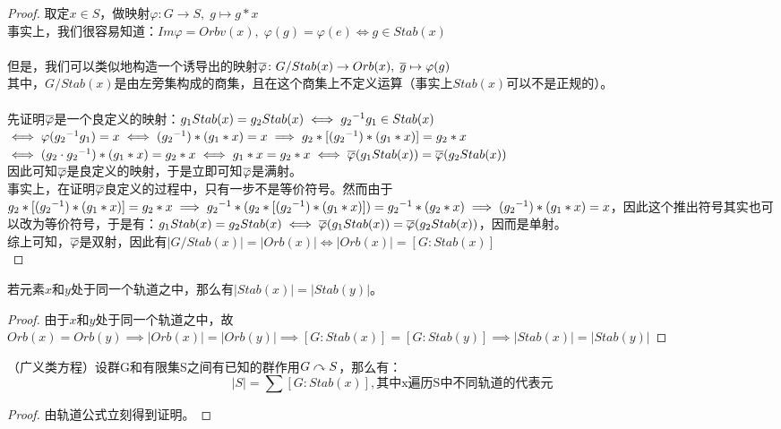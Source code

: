 \begin{proof}
取定$x\in S$，做映射$\varphi\colon G\to S,\; g\mapsto g*x$\\
事实上，我们很容易知道：$Im\varphi =Orbv(x),\; \varphi(g)=\varphi(e)\iff g\in Stab(x)$\\
\\
但是，我们可以类似地构造一个诱导出的映射$\overline{\varphi} \colon G/Stab(x)\to Orb(x),\;\overline{g}\mapsto\varphi(g)$\\
其中，$G/Stab(x)$是由左旁集构成的商集，且在这个商集上不定义运算（事实上$Stab(x)$可以不是正规的）。\\
\\
先证明$\overline{\varphi}$是一个良定义的映射：$g_1Stab(x)=g_2Stab(x)\iff {g_2}^{-1}g_1\in Stab(x)$\\
$\iff \varphi({g_2}^{-1}g_1)=x\iff ({g_2}^{-1})*(g_1*x)=x \implies g_2*[({g_2}^{-1})*(g_1*x)]=g_2*x$\\
$\iff (g_2\cdot {g_2}^{-1})*(g_1*x)=g_2*x\iff g_1*x=g_2*x\iff \overline{\varphi}(g_1Stab(x))=\overline{\varphi}(g_2Stab(x))$\\
因此可知$\overline{\varphi}$是良定义的映射，于是立即可知$\overline{\varphi}$是满射。\\
事实上，在证明$\overline{\varphi}$良定义的过程中，只有一步不是等价符号。然而由于$g_2*[({g_2}^{-1})*(g_1*x)]=g_2*x\implies {g_2}^{-1}*(g_2*[({g_2}^{-1})*(g_1*x)])={g_2}^{-1}*(g_2*x)\implies ({g_2}^{-1})*(g_1*x)=x$，因此这个推出符号其实也可以改为等价符号，于是有：$g_1Stab(x)=g_2Stab(x)\iff\overline{\varphi}(g_1Stab(x))=\overline{\varphi}(g_2Stab(x))$，因而是单射。\\
综上可知，$\overline{\varphi}$是双射，因此有$|G/Stab(x)|=|Orb(x)|\iff |Orb(x)|=[G:Stab(x)]$\\
\end{proof}
若元素$x$和$y$处于同一个轨道之中，那么有$|Stab(x)|=|Stab(y)|$。
\begin{proof}
\indent 由于$x$和$y$处于同一个轨道之中，故$Orb(x)=Orb(y)\implies |Orb(x)|=|Orb(y)|\implies [G:Stab(x)]=[G:Stab(y)]\implies |Stab(x)|=|Stab(y)|$
\end{proof}
（广义类方程）设群G和有限集S之间有已知的群作用$G\curvearrowright S$，那么有：
\[
|S|=\sum [G:Stab(x)],\text{其中x遍历S中不同轨道的代表元}
\]
\begin{proof}
由轨道公式立刻得到证明。
\end{proof}
